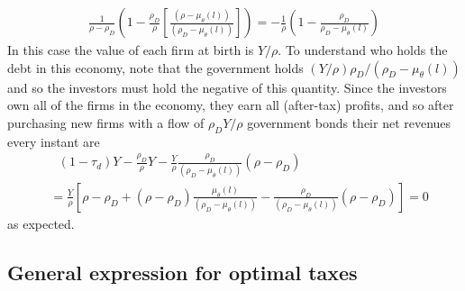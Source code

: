 \documentclass[11pt]{article}
\theoremstyle{plain}
\begin{document}
\begin{align*}
\frac{1}{\rho-\rho_D}{\left(1 - \frac{\rho_D}{\rho}{\left[\frac{(\rho - \mu_{\theta}(l))}{(\rho_D - \mu_{\theta}(l))}  \right]}\right)} = -\frac{1}{\rho}{\left(1 - \frac{\rho_D}{\rho_D - \mu_{\theta}(l)}\right)}
\end{align*} %
In this case the value of each firm at birth is $Y/\rho$. To understand who holds the debt in this economy, note that the government holds $(Y/\rho)\rho_D/(\rho_D - \mu_{\theta}(l))$ and so the investors must hold the negative of this quantity. Since the investors own all of the firms in the economy, they earn all (after-tax) profits, and so after purchasing new firms with a flow of $\rho_DY/\rho$ government bonds their net revenues every instant are 
\begin{align*}
& \ \ \ (1-\tau_d)Y - \frac{\rho_D}{\rho}Y - \frac{Y}{\rho}\frac{\rho_D}{(\rho_D - \mu_{\theta}(l))}(\rho - \rho_D)
\\ & = \frac{Y}{\rho}{\left[\rho - \rho_D + (\rho - \rho_D) \frac{\mu_{\theta}(l)}{(\rho_D - \mu_{\theta}(l))} - \frac{\rho_D}{(\rho_D - \mu_{\theta}(l))}(\rho - \rho_D)\right]} = 0
\end{align*}
as expected.

\subsection{General expression for optimal taxes} \label{genFOC}
\end{document}
